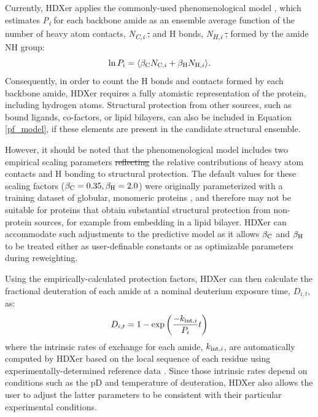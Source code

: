 \documentclass[9pt,tutorial]{livecoms}
\providecommand{\DIFadd}[1]{{\protect\color{blue}\uwave{#1}}} %
\providecommand{\DIFdel}[1]{{\protect\color{red}\sout{#1}}}                      %
\providecommand{\DIFaddbegin}{} %
\providecommand{\DIFaddend}{} %
\providecommand{\DIFdelbegin}{} %
\providecommand{\DIFdelend}{} %
\begin{document}
\DIFaddend Currently, HDXer applies the commonly-used phenomenological model \cite{VendruscoloPaci2003, BestVendruscolo2006}, which estimates \textit{P\textsubscript{i}} for each backbone amide as an ensemble average function of the number of heavy atom contacts, \textit{N\textsubscript{C,i}} \DIFdelbegin \DIFdel{, }\DIFdelend and H bonds, \textit{N\textsubscript{H,i}} \DIFdelbegin \DIFdel{, }\DIFdelend formed by the amide NH group: 
\begin{equation}\label{pf_model}
    \ln{P_i} = \langle \beta_\textnormal{C} N_{\textnormal{C},i} + \beta_\textnormal{H} N_{\textnormal{H},i} \rangle.
\end{equation} 
Consequently, in order to count the H bonds and contacts formed by each backbone amide, HDXer requires a fully atomistic representation of the protein, including hydrogen atoms.
Structural protection from other sources, such as bound ligands, co-factors, or lipid bilayers, can also be included in Equation \ref{pf_model}, if these elements are present in the candidate structural ensemble. 
\DIFaddbegin 

\DIFaddend However, it should be noted that the phenomenological model includes two empirical scaling parameters \DIFdelbegin \DIFdel{reflecting }\DIFdelend \DIFaddbegin \DIFadd{to reflect }\DIFaddend the relative contributions of heavy atom contacts and H bonding to structural protection. 
The default values for these scaling factors ($\beta_\textnormal{C} = 0.35, \beta_\textnormal{H} = 2.0$) were originally parameterized with a training dataset of globular, monomeric proteins \cite{BestVendruscolo2006}, and therefore may not be suitable for proteins that obtain substantial structural protection from non-protein sources, for example from embedding in a lipid bilayer.
HDXer can accommodate such adjustments to the predictive model as it allows $\beta_\textnormal{C}$ and $\beta_\textnormal{H}$ to be treated either as user-definable constants or as optimizable parameters during reweighting.

Using the empirically-calculated protection factors, HDXer can then calculate the fractional deuteration of each amide at a nominal deuterium exposure time, $D_{i,t}$, as:
\begin{equation}\label{Df_eqn}
    D_{i,t} = 1 - \exp\left( \frac{-k_{\textnormal{int},i}}{P_i}t \right)
\end{equation}
where the intrinsic rates of exchange for each amide, $k_{\textnormal{int},i}$, are automatically computed by HDXer based on the local sequence of each residue using experimentally-determined reference data \cite{Bai1993, Nguyen2018}. 
Since those intrinsic rates depend on conditions such as the pD and temperature of deuteration, HDXer also allows the user to adjust the latter parameters to be consistent with their particular experimental conditions.
\end{document}
